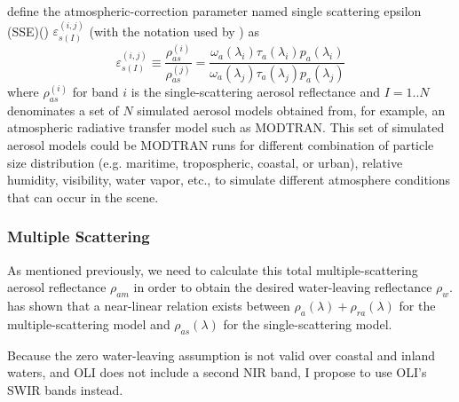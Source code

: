 \cite{Gordon:1994} define the atmospheric-correction parameter named single scattering epsilon (SSE)(\cite{IOCCG:2010}) $\varepsilon_{s(I)}^{(i,j)}$ (with the notation used by \cite{Ruddick:2000bs}) as
\begin{equation}\label{eq:espilon}
    \varepsilon_{s(I)}^{(i,j)} \equiv \frac{\rho_{as}^{(i)}}{\rho_{as}^{(j)}} = \frac{\omega_a(\lambda_i)\tau_a(\lambda_i)p_a(\lambda_i)}{\omega_a(\lambda_j)\tau_a(\lambda_j)p_a(\lambda_j)}
\end{equation}
where $\rho_{as}^{(i)}$ for band $i$ is the single-scattering aerosol reflectance and $I=1..N$ denominates a set of $N$ simulated aerosol models obtained from, for example, an atmospheric radiative transfer model such as MODTRAN. This set of simulated aerosol models could be MODTRAN runs for different combination of particle size distribution (e.g. maritime, tropospheric, coastal, or urban), relative humidity, visibility, water vapor, etc., to simulate different atmosphere conditions that can occur in the scene.

\subsubsection{Multiple Scattering}
As mentioned  previously, we need to calculate this total multiple-scattering aerosol reflectance $\rho_{am}$ in order to obtain the desired water-leaving reflectance $\rho_w$. \cite{Wang:1991} has shown that a near-linear relation exists between $\rho_a(\lambda)+\rho_{ra}(\lambda)$ for the multiple-scattering model and $\rho_{as}(\lambda)$ for the single-scattering model.


Because the zero water-leaving assumption is not valid over coastal and inland waters, and OLI does not include a second NIR band, I propose to use OLI's SWIR bands instead.

